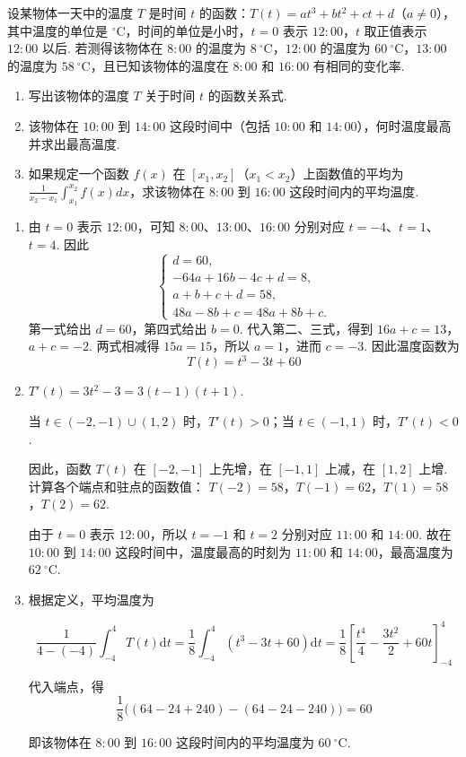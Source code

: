 \documentclass[UTF8,a4paper,oneside,11pt]{ctexbook}
\begin{document}
\begin{problem}
设某物体一天中的温度 \(T\) 是时间 \(t\) 的函数：\(T(t)=at^3+bt^2+ct+d\)（\(a\ne0\)），其中温度的单位是 \(^{\circ}\mathrm{C}\)，时间的单位是小时，\(t=0\) 表示 \(12{:}00\)，\(t\) 取正值表示 \(12{:}00\) 以后. 若测得该物体在 \(8{:}00\) 的温度为 \(8\mathrm{~^{\circ}C}\)，\(12{:}00\) 的温度为 \(60\mathrm{~^{\circ}C}\)，\(13{:}00\) 的温度为 \(58\mathrm{~^{\circ}C}\)，且已知该物体的温度在 \(8{:}00\) 和 \(16{:}00\) 有相同的变化率.

\begin{enumerate}
\item 写出该物体的温度 \(T\) 关于时间 \(t\) 的函数关系式.
\item 该物体在 \(10{:}00\) 到 \(14{:}00\) 这段时间中（包括 \(10{:}00\) 和 \(14{:}00\)），何时温度最高并求出最高温度.
\item 如果规定一个函数 \(f(x) \) 在 \([x_1, x_2]\)（\(x_1 < x_2\)）上函数值的平均为 \(\frac{1}{x_2 - x_1} \int_{x_1}^{x_2} f(x) dx\)，求该物体在 \(8{:}00\) 到 \(16{:}00\) 这段时间内的平均温度.
\end{enumerate}
\end{problem}

\begin{solution}
\begin{enumerate}
\item 由 \(t=0\) 表示 \(12{:}00\)，可知 \(8{:}00\)、\(13{:}00\)、\(16{:}00\) 分别对应 \(t=-4\)、\(t=1\)、\(t=4\). 因此
\[
\begin{cases}
d=60,\\
-64a+16b-4c+d=8,\\
a+b+c+d=58,\\
48a-8b+c=48a+8b+c.
\end{cases}
\]
第一式给出 \(d=60\)，第四式给出 \(b=0\). 代入第二、三式，得到
\(16a+c=13\)，\(a+c=-2\).
两式相减得 \(15a=15\)，所以 \(a=1\)，进而 \(c=-3\). 因此温度函数为
\[
T(t)=t^3-3t+60
\]

\item \(T'(t)=3t^2-3=3(t-1)(t+1)\).

当 \(t\in(-2,-1)\cup(1,2)\) 时，\(T'(t)>0\)；当 \(t\in(-1,1)\) 时，\(T'(t)<0\).

因此，函数 \(T(t)\) 在 \([-2,-1]\) 上先增，在 \([-1,1]\) 上减，在 \([1,2]\) 上增. 计算各个端点和驻点的函数值：
\(T(-2)=58\)，\(T(-1)=62\)，\(T(1)=58\)，\(T(2)=62\).

由于 \(t=0\) 表示 \(12{:}00\)，所以 \(t=-1\) 和 \(t=2\) 分别对应 \(11{:}00\) 和 \(14{:}00\). 故在 \(10{:}00\) 到 \(14{:}00\) 这段时间中，温度最高的时刻为 \(11{:}00\) 和 \(14{:}00\)，最高温度为 \(62\mathrm{~^{\circ}C}\).

\item 根据定义，平均温度为

\[
\frac{1}{4-(-4)}\int_{-4}^{4}T(t)\mathrm{d}t
=\frac18\int_{-4}^{4}(t^3-3t+60)\mathrm{d}t
 =\frac18\left[\frac{t^4}{4}-\frac{3t^2}{2}+60t\right]_{-4}^{4}
\]

代入端点，得
\[
\frac18\bigl((64-24+240)-(64-24-240)\bigr)=60
\]

即该物体在 \(8{:}00\) 到 \(16{:}00\) 这段时间内的平均温度为 \(60\mathrm{~^{\circ}C}\).
\end{enumerate}
\end{solution}
\end{document}
